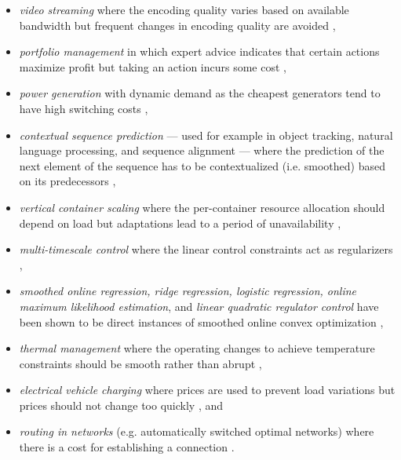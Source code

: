 \begin{itemize}
    \item \textit{video streaming} where the encoding quality varies based on available bandwidth but frequent changes in encoding quality are avoided \cite{Lin2012},
    \item \textit{portfolio management} in which expert advice indicates that certain actions maximize profit but taking an action incurs some cost \cite{Calafiore2008, Das2014, Ballu2019},
    \item \textit{power generation} with dynamic demand as the cheapest generators tend to have high switching costs \cite{Lin2012, Badiei2015},
    \item \textit{contextual sequence prediction} --- used for example in object tracking, natural language processing, and sequence alignment --- where the prediction of the next element of the sequence has to be contextualized (i.e. smoothed) based on its predecessors \cite{Kim2015},
    \item \textit{vertical container scaling} where the per-container resource allocation should depend on load but adaptations lead to a period of unavailability \cite{Rossi2019},
    \item \textit{multi-timescale control} where the linear control constraints act as regularizers \cite{Goel2017},
    \item \textit{smoothed online regression, ridge regression, logistic regression, online maximum likelihood estimation}, and \textit{linear quadratic regulator control} have been shown to be direct instances of smoothed online convex optimization \cite{Goel2018},
    \item \textit{thermal management} where the operating changes to achieve temperature constraints should be smooth rather than abrupt \cite{Zanini2009},
    \item \textit{electrical vehicle charging} where prices are used to prevent load variations but prices should not change too quickly \cite{Kim2014}, and
    \item \textit{routing in networks} (e.g. automatically switched optimal networks) where there is a cost for establishing a connection \cite{Lin2012}.
\end{itemize}
